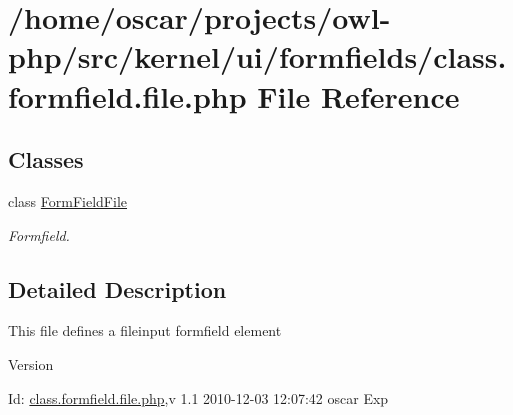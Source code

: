 \section{/home/oscar/projects/owl-\/php/src/kernel/ui/formfields/class.formfield.file.php File Reference}
\label{class_8formfield_8file_8php}
\subsection*{Classes}
\begin{DoxyCompactItemize}
\item 
class \hyperlink{classFormFieldFile}{FormFieldFile}
\begin{DoxyCompactList}\small\item\em Formfield. \item\end{DoxyCompactList}\end{DoxyCompactItemize}


\subsection{Detailed Description}
This file defines a fileinput formfield element \begin{DoxyVersion}{Version}

\end{DoxyVersion}
\begin{DoxyParagraph}{Id:}
\hyperlink{class_8formfield_8file_8php}{class.formfield.file.php},v 1.1 2010-\/12-\/03 12:07:42 oscar Exp 
\end{DoxyParagraph}
